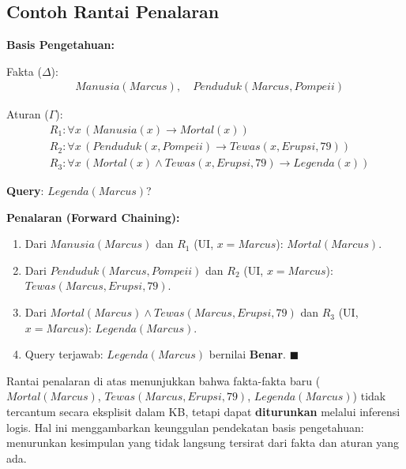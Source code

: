 \subsection{Contoh Rantai Penalaran}

\begin{contoh}
\textbf{Basis Pengetahuan:}

Fakta ($\Delta$):
\begin{align*}
&Manusia(Marcus), \quad Penduduk(Marcus, Pompeii)
\end{align*}

Aturan ($\Gamma$):
\begin{align*}
&R_1: \forall x\, (Manusia(x) \rightarrow Mortal(x)) \\
&R_2: \forall x\, (Penduduk(x, Pompeii) \rightarrow Tewas(x, Erupsi, 79)) \\
&R_3: \forall x\, (Mortal(x) \wedge Tewas(x, Erupsi, 79) \rightarrow Legenda(x))
\end{align*}

\textbf{Query}: $Legenda(Marcus)$?

\textbf{Penalaran (Forward Chaining):}
\begin{enumerate}
    \item Dari $Manusia(Marcus)$ dan $R_1$ (UI, $x = Marcus$): $Mortal(Marcus)$.
    \item Dari $Penduduk(Marcus, Pompeii)$ dan $R_2$ (UI, $x = Marcus$): $Tewas(Marcus, Erupsi, 79)$.
    \item Dari $Mortal(Marcus) \wedge Tewas(Marcus, Erupsi, 79)$ dan $R_3$ (UI, $x = Marcus$): $Legenda(Marcus)$.
    \item Query terjawab: $Legenda(Marcus)$ bernilai \textbf{Benar}. $\blacksquare$
\end{enumerate}
\end{contoh}

\begin{konsep}
Rantai penalaran di atas menunjukkan bahwa fakta-fakta baru ($Mortal(Marcus)$, $Tewas(Marcus, Erupsi, 79)$, $Legenda(Marcus)$) tidak tercantum secara eksplisit dalam KB, tetapi dapat \textbf{diturunkan} melalui inferensi logis. Hal ini menggambarkan keunggulan pendekatan basis pengetahuan: menurunkan kesimpulan yang tidak langsung tersirat dari fakta dan aturan yang ada.
\end{konsep}
